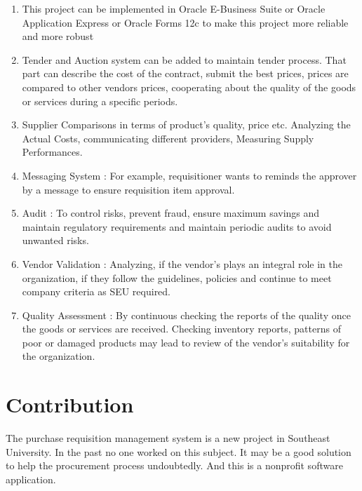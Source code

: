 \documentclass[12pt]{report} %
\begin{document}

\renewcommand{\labelenumi}{\alph{enumi})}
\begin{enumerate}
	\item This project can be implemented in Oracle E-Business Suite or Oracle Application Express or  Oracle Forms 12c to make this project more reliable and more robust
	\item Tender and Auction system can be added to maintain tender process. That part can describe the cost of the contract, submit the best prices, prices are compared to other vendors prices, cooperating about the quality of the goods or services during a specific periods.
	\item Supplier Comparisons in terms of product's quality, price etc. Analyzing the Actual Costs, communicating different providers, Measuring Supply Performances. 
	\item Messaging System : For example, requisitioner wants to reminds the approver by a message to ensure requisition item approval.
	\item Audit : To control risks, prevent fraud, ensure maximum savings and maintain regulatory requirements and maintain periodic audits to avoid unwanted risks. 
	\item Vendor Validation : Analyzing, if the vendor's plays an integral role in the organization, if they follow the guidelines, policies and continue to meet company criteria as SEU required.
	\item Quality Assessment : By continuous checking the reports of the quality once the goods or services are received. Checking inventory reports, patterns of poor or damaged products may lead to review of the vendor's suitability for the organization.
	
\end{enumerate}

\section*{Contribution}

The purchase requisition management system is a new project in Southeast University. In the past no one worked on this subject. It may be a good solution to help the procurement process undoubtedly. And this is a nonprofit software application.
\end{document}
